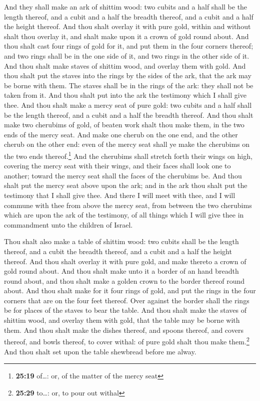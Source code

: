  And they shall make an ark of shittim wood: two cubits
and a half shall be the length thereof, and a cubit and a half the
breadth thereof, and a cubit and a half the height thereof.
 And thou shalt overlay it with pure gold, within and
without shalt thou overlay it, and shalt make upon it a crown of gold
round about.  And thou shalt cast four rings of gold for
it, and put them in the four corners thereof; and two rings shall be in
the one side of it, and two rings in the other side of it.
 And thou shalt make staves of shittim wood, and overlay
them with gold.  And thou shalt put the staves into the
rings by the sides of the ark, that the ark may be borne with them.
 The staves shall be in the rings of the ark: they shall
not be taken from it.  And thou shalt put into the ark
the testimony which I shall give thee.  And thou shalt
make a mercy seat of pure gold: two cubits and a half shall be the
length thereof, and a cubit and a half the breadth thereof.
 And thou shalt make two cherubims of gold, of beaten
work shalt thou make them, in the two ends of the mercy seat.
 And make one cherub on the one end, and the other cherub
on the other end: even of the mercy seat shall ye make the cherubims on
the two ends thereof.\footnote{\textbf{25:19} of\ldots: or, of the
  matter of the mercy seat}  And the cherubims shall
stretch forth their wings on high, covering the mercy seat with their
wings, and their faces shall look one to another; toward the mercy seat
shall the faces of the cherubims be.  And thou shalt put
the mercy seat above upon the ark; and in the ark thou shalt put the
testimony that I shall give thee.  And there I will meet
with thee, and I will commune with thee from above the mercy seat, from
between the two cherubims which are upon the ark of the testimony, of
all things which I will give thee in commandment unto the children of
Israel.

 Thou shalt also make a table of shittim wood: two cubits
shall be the length thereof, and a cubit the breadth thereof, and a
cubit and a half the height thereof.  And thou shalt
overlay it with pure gold, and make thereto a crown of gold round about.
 And thou shalt make unto it a border of an hand breadth
round about, and thou shalt make a golden crown to the border thereof
round about.  And thou shalt make for it four rings of
gold, and put the rings in the four corners that are on the four feet
thereof.  Over against the border shall the rings be for
places of the staves to bear the table.  And thou shalt
make the staves of shittim wood, and overlay them with gold, that the
table may be borne with them.  And thou shalt make the
dishes thereof, and spoons thereof, and covers thereof, and bowls
thereof, to cover withal: of pure gold shalt thou make them.\footnote{\textbf{25:29}
  to\ldots: or, to pour out withal}  And thou shalt set
upon the table shewbread before me alway.

